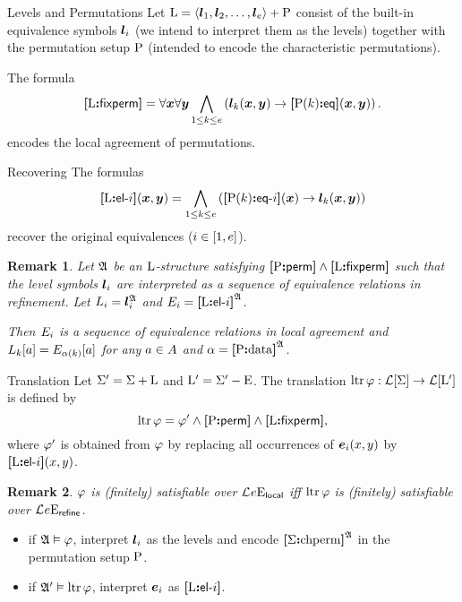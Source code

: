 \documentclass{beamer}
\newtheorem{remark}{Remark}
\begin{document}
\begin{frame}{Levels and Permutations}
Let ${\mathrm{L}} = \left\langle \bm{l}_{1},\bm{l}_{2},\dots,\bm{l}_{e} \right\rangle + {\mathrm{P}}$ consist of the built-in
equivalence symbols $\bm{l}_{i}$ (we intend to interpret them as the levels)
together with the permutation setup ${\mathrm{P}}$ (intended to encode the
characteristic permutations).

The formula
\[
  {\bm{[}{\mathrm{L}}\mathord{\bm{:}}\mathsf{fixperm}\bm{]}} = \forall\bm{x} \forall\bm{y} \bigwedge_{1 \leq k \leq e}
  \left(\bm{l}_{k}(\bm{x},\bm{y}) \rightarrow {\bm{[}{\mathrm{P}}(k)\mathord{\bm{:}}\mathsf{eq}\bm{]}}(\bm{x},\bm{y})\right).
\]
encodes the local agreement of permutations.
\end{frame}

\begin{frame}{Recovering}
The formulas
\[
  {\bm{[}{\mathrm{L}}\mathord{\bm{:}}\mathsf{el}{\hbox{-}}i\bm{]}}(\bm{x},\bm{y}) = \bigwedge_{1 \leq k \leq e}
  \left({\bm{[}{\mathrm{P}}(k)\mathord{\bm{:}}\mathsf{eq}{\hbox{-}}i\bm{]}}(\bm{x}) \rightarrow \bm{l}_{k}(\bm{x},\bm{y})\right)
\]
recover the original equivalences ($i\in[1,e]$).
\begin{remark}
Let $\mathfrak{A}$ be an ${\mathrm{L}}$-structure satisfying
${\bm{[}{\mathrm{P}}\mathord{\bm{:}}\mathsf{perm}\bm{]}}\land{\bm{[}{\mathrm{L}}\mathord{\bm{:}}\mathsf{fixperm}\bm{]}}$ such that the level symbols $\bm{l}_{i}$ are
interpreted as a sequence of equivalence relations in refinement.
Let $L_{i} = \bm{l}_{i}^{\mathfrak{A}}$ and $E_{i} = {\bm{[}{\mathrm{L}}\mathord{\bm{:}}\mathsf{el}{\hbox{-}}i\bm{]}}^{\mathfrak{A}}$.

Then $E_{i}$ is a sequence of equivalence relations in local agreement and
$L_{k}[a] = E_{\alpha(k)}[a]$ for any $a\in A$ and $\alpha =
{\bm{[}{\mathrm{P}}\mathord{\bm{:}}\mathrm{data}\bm{]}}^{\mathfrak{A}}$.
\end{remark}
\end{frame}

\begin{frame}{Translation}
Let $\Sigma' = \Sigma + {\mathrm{L}}$ and ${\mathrm{L}}' = \Sigma' - {\mathrm{E}}$.
The translation $\operatorname{ltr}\varphi : \mathcal{L}[\Sigma] \to \mathcal{L}[{{\mathrm{L}}'}]$ is defined by
\[
  \operatorname{ltr}\varphi = {\varphi'} \land {\bm{[}{\mathrm{P}}\mathord{\bm{:}}\mathsf{perm}\bm{]}} \land {\bm{[}{\mathrm{L}}\mathord{\bm{:}}\mathsf{fixperm}\bm{]}},
\]
where ${\varphi'}$ is obtained from $\varphi$ by replacing all occurrences
of $\bm{e}_{i}(x,y)$ by ${\bm{[}{\mathrm{L}}\mathord{\bm{:}}\mathsf{el}{\hbox{-}}i\bm{]}}(x,y)$.
\begin{remark}
$\varphi$ is (finitely) satisfiable over $\mathcal{L}^{{}}_{{}}{e}\mathrm{E}_{\mathsf{local}}$ iff
$\operatorname{ltr}\varphi$ is (finitely) satisfiable over
$\mathcal{L}^{{}}_{{}}{e}\mathrm{E}_{\mathsf{refine}}$.
\end{remark}
\begin{itemize}
  \item
  if $\mathfrak{A}\vDash\varphi$, interpret $\bm{l}_{i}$ as the levels and encode
  ${\bm{[}\Sigma\mathord{\bm{:}}\mathrm{chperm}\bm{]}}^{\mathfrak{A}}$ in the permutation setup ${\mathrm{P}}$.
  
  \item
  if $\mathfrak{A'}\vDash\operatorname{ltr}\varphi$, interpret $\bm{e}_{i}$ as ${\bm{[}{\mathrm{L}}\mathord{\bm{:}}\mathsf{el}{\hbox{-}}i\bm{]}}$.
\end{itemize}
\end{frame}
\end{document}

